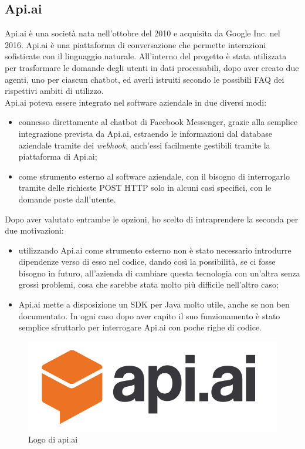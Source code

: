 \subsection{Api.ai}
Api.ai è una società nata nell'ottobre del 2010 e acquisita da Google Inc. nel 2016. Api.ai è una piattaforma di conversazione
che permette interazioni sofisticate con il linguaggio naturale. All'interno del progetto è stata utilizzata per trasformare le domande degli utenti in dati processabili, dopo aver creato due agenti, uno per ciascun \gls{chatbot}, ed averli istruiti secondo le possibili \gls{FAQ} dei rispettivi ambiti di utilizzo.\\
Api.ai poteva essere integrato nel software aziendale in due diversi modi:
\begin{itemize}
	\item connesso direttamente al \gls{chatbot} di Facebook Messenger, grazie alla semplice integrazione prevista da Api.ai, estraendo le informazioni dal database aziendale tramite dei \emph{webhook}, anch'essi facilmente gestibili tramite la piattaforma di Api.ai;
	\item come strumento esterno al software aziendale, con il bisogno di interrogarlo tramite delle richieste \gls{POST} HTTP solo in alcuni casi specifici, con le domande poste dall'utente.
\end{itemize} 
Dopo aver valutato entrambe le opzioni, ho scelto di intraprendere la seconda per due motivazioni:
\begin{itemize}
	\item utilizzando Api.ai come strumento esterno non è stato necessario introdurre dipendenze verso di esso nel codice, dando così la possibilità, se ci fosse bisogno in futuro, all'azienda di cambiare questa tecnologia con un'altra senza grossi problemi, cosa che sarebbe stata molto più difficile nell'altro caso;
	\item Api.ai mette a disposizione un \gls{SDK} per Java molto utile, anche se non ben documentato. In ogni caso dopo aver capito il suo funzionamento è stato semplice sfruttarlo per interrogare Api.ai con poche righe di codice. 
\end{itemize}
\begin{figure}[h]
	\centering
	\includegraphics[scale=0.2]{../Immagini/apiai.png}
	\caption{Logo di api.ai}
\end{figure}
